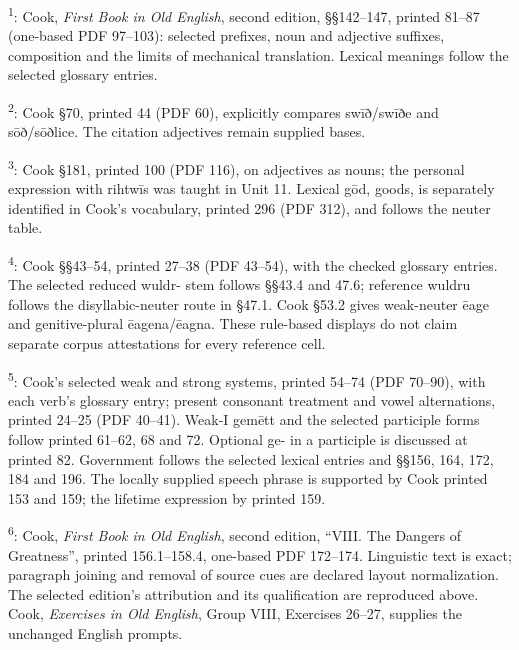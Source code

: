 \textsuperscript{1}: Cook, \emph{First Book in Old English}, second edition, §§142–147, printed 81–87 (one-based PDF 97–103): selected prefixes, noun and adjective suffixes, composition and the limits of mechanical translation. Lexical meanings follow the selected glossary entries.

\textsuperscript{2}: Cook §70, printed 44 (PDF 60), explicitly compares swīð/\allowbreak{}swīðe and sōð/\allowbreak{}sōðlice. The citation adjectives remain supplied bases.

\textsuperscript{3}: Cook §181, printed 100 (PDF 116), on adjectives as nouns; the personal expression with rihtwīs was taught in Unit 11. Lexical gōd, goods, is separately identified in Cook’s vocabulary, printed 296 (PDF 312), and follows the neuter table.

\textsuperscript{4}: Cook §§43–54, printed 27–38 (PDF 43–54), with the checked glossary entries. The selected reduced wuldr- stem follows §§43.4 and 47.6; reference wuldru follows the disyllabic-neuter route in §47.1. Cook §53.2 gives weak-neuter ēage and genitive-plural ēagena/\allowbreak{}ēagna. These rule-based displays do not claim separate corpus attestations for every reference cell.

\textsuperscript{5}: Cook’s selected weak and strong systems, printed 54–74 (PDF 70–90), with each verb’s glossary entry; present consonant treatment and vowel alternations, printed 24–25 (PDF 40–41). Weak-I gemētt and the selected participle forms follow printed 61–62, 68 and 72. Optional ge- in a participle is discussed at printed 82. Government follows the selected lexical entries and §§156, 164, 172, 184 and 196. The locally supplied speech phrase is supported by Cook printed 153 and 159; the lifetime expression by printed 159.

\textsuperscript{6}: Cook, \emph{First Book in Old English}, second edition, “VIII. The Dangers of Greatness”, printed 156.1–158.4, one-based PDF 172–174. Linguistic text is exact; paragraph joining and removal of source cues are declared layout normalization. The selected edition’s attribution and its qualification are reproduced above. Cook, \emph{Exercises in Old English}, Group VIII, Exercises 26–27, supplies the unchanged English prompts.

\endgroup

\par\label{end-ch14-learner}
\clearpage\endgroup
